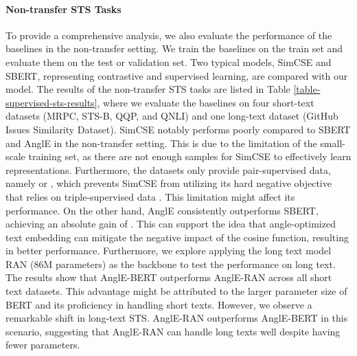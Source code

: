 \documentclass{article} \usepackage{iclr2024_conference,times}
\begin{document}
\begin{table*}[ht]
\begin{threeparttable}
\begin{tabular}{lcccccccc}
\bottomrule
\end{tabular}
\end{threeparttable}
\caption{Text embedding performance on STS tasks. We report the Spearman's correlation  of the ``all'' setting computed by SentEval. For supervised LLaMA-based models, we fine-tuned them using the LoRA \citep{hu2021lora} technique and used the prompt ``\textit{Summarize sentence \{sentence\} in one word:}'' sparked by \citep{jiang2023scaling}. Results marked with  are obtained from \citep{sbert-nils-2019}, while results marked with  are retrieved from \citep{simcse_gao_2021}. Additionally, results marked with  denote our own implementation using official code. For the remaining baselines, we refer to the corresponding original papers to obtain their results. 
}
\label{table-main-sts-results}
\end{table*}

\paragraph{Non-transfer STS Tasks} To provide a comprehensive analysis, we also evaluate the performance of the baselines in the non-transfer setting. We train the baselines on the train set and evaluate them on the test or validation set. Two typical models, SimCSE and SBERT, representing contrastive and supervised learning, are compared with our model. The results of the non-transfer STS tasks are listed in Table \ref{table-supervised-sts-results}, where we evaluate the baselines on four short-text datasets (MRPC, STS-B, QQP, and QNLI) and one long-text dataset (GitHub Issues Similarity Dataset). SimCSE notably performs poorly compared to SBERT and AnglE in the non-transfer setting. This is due to the limitation of the small-scale training set, as there are not enough samples for SimCSE to effectively learn representations. Furthermore, the datasets only provide pair-supervised data, namely  or , which prevents SimCSE from utilizing its hard negative objective that relies on triple-supervised data . This limitation might affect its performance. On the other hand, AnglE consistently outperforms SBERT, achieving an absolute gain of . This can support the idea that angle-optimized text embedding can mitigate the negative impact of the cosine function, resulting in better performance. Furthermore, we explore applying the long text model RAN (86M parameters) \citep{li-etal-2023-recurrent} as the backbone to test the performance on long text. The results show that AnglE-BERT outperforms AnglE-RAN across all short text datasets. This advantage might be attributed to the larger parameter size of BERT and its proficiency in handling short texts. However, we observe a remarkable shift in long-text STS. AnglE-RAN outperforms AnglE-BERT in this scenario, suggesting that AnglE-RAN can handle long texts well despite having fewer parameters.
\end{document}
